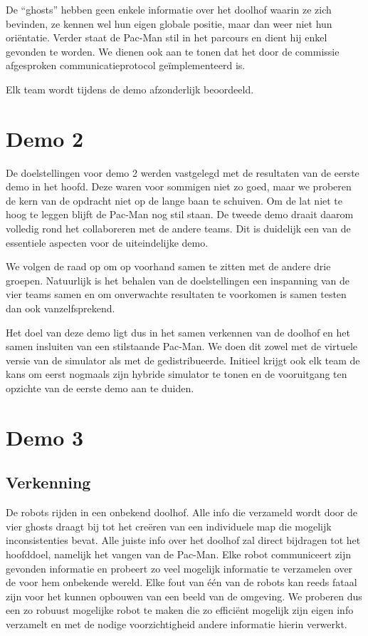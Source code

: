 \documentclass[12pt,a4paper]{report}
\begin{document}
De ``ghosts'' hebben geen enkele informatie over het doolhof waarin ze zich bevinden, ze kennen wel hun eigen globale positie, maar dan weer niet hun ori\"entatie. Verder staat de Pac-Man stil in het parcours en dient hij enkel gevonden te worden. We dienen ook aan te tonen dat het door de commissie afgesproken communicatieprotocol ge\"implementeerd is.

Elk team wordt tijdens de demo afzonderlijk beoordeeld.
 
\section{Demo 2}
 
De doelstellingen voor demo 2 werden vastgelegd met de resultaten van de eerste demo in het hoofd. Deze waren voor sommigen niet zo goed, maar we proberen de kern van de opdracht niet op de lange baan te schuiven. Om de lat niet te hoog te leggen blijft de Pac-Man nog stil staan. De tweede demo draait daarom volledig rond het collaboreren met de andere teams. Dit is duidelijk een van de essentiele aspecten voor de uiteindelijke demo. 

We volgen de raad op om op voorhand samen te zitten met de andere drie groepen. Natuurlijk is het behalen van de doelstellingen een inspanning van de vier teams samen en om onverwachte resultaten te voorkomen is samen testen dan ook vanzelfsprekend.

Het doel van deze demo ligt dus in het samen verkennen van de doolhof en het samen insluiten van een stilstaande Pac-Man. We doen dit zowel met de virtuele versie van de simulator als met de gedistribueerde. Initieel krijgt ook elk team de kans om eerst nogmaals zijn hybride simulator te tonen en de vooruitgang ten opzichte van de eerste demo aan te duiden.

\section{Demo 3}

\subsection{Verkenning}

De robots rijden in een onbekend doolhof. Alle info die verzameld wordt door de vier ghosts draagt bij tot het cre\"eren van een individuele map die mogelijk inconsistenties bevat. Alle juiste info over het doolhof zal direct bijdragen tot het hoofddoel, namelijk het vangen van de Pac-Man. Elke robot communiceert zijn gevonden informatie en probeert zo veel mogelijk informatie te verzamelen over de voor hem onbekende wereld. Elke fout van \'e\'en van de robots kan reeds fataal zijn voor het kunnen opbouwen van een beeld van de omgeving. We proberen dus een zo robuust mogelijke robot te maken die zo effici\"ent mogelijk zijn eigen info verzamelt en met de nodige voorzichtigheid andere informatie hierin verwerkt.
\end{document}
